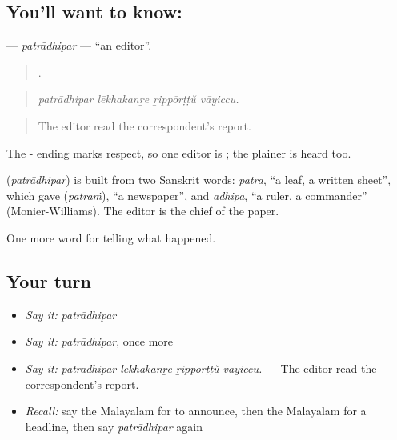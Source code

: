 \subsection*{You'll want to know: }
\textbf{} — \emph{patrādhipar} — \textquotedblleft{}an editor\textquotedblright{}.

\begin{quote}
   .
\end{quote}

\begin{quote}
\emph{patrādhipar lēkhakanṟe ṟippōrṭṭŭ vāyiccu.}
\end{quote}

\begin{quote}
The editor read the correspondent's report.
\end{quote}

The - ending marks respect, so one editor is ; the plainer  is heard too.

\begin{cousinweb}
\textbf{} (\emph{patrādhipar}) is built from two Sanskrit words: \emph{patra}, \textquotedblleft{}a leaf, a written sheet\textquotedblright{}, which gave  (\emph{patraṁ}), \textquotedblleft{}a newspaper\textquotedblright{}, and \emph{adhipa}, \textquotedblleft{}a ruler, a commander\textquotedblright{} (Monier-Williams). The editor is the chief of the paper.
\end{cousinweb}

\begin{grammarlens}[title={What you've built}]
One more word for telling what happened.
\end{grammarlens}

\subsection*{Your turn}
\begin{itemize}
\raggedright
  \item \emph{Say it:} \emph{patrādhipar}
  \item \emph{Say it:} \emph{patrādhipar}, once more
  \item \emph{Say it:} \emph{patrādhipar lēkhakanṟe ṟippōrṭṭŭ vāyiccu.} — The editor read the correspondent's report.
  \item \emph{Recall:} say the Malayalam for to announce, then the Malayalam for a headline, then say \emph{patrādhipar} again
\end{itemize}


